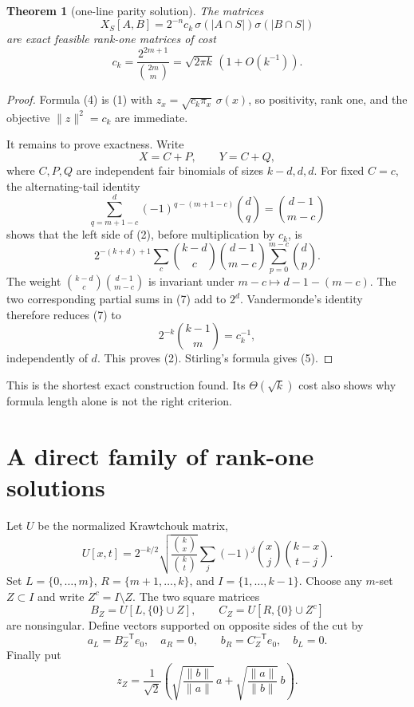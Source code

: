 \documentclass[11pt]{article}
\newcommand{\1}{\mathbf 1}
\newcommand{\norm}[1]{\lVert#1\rVert}
\newtheorem{theorem}{Theorem}
\begin{document}
\begin{theorem}[one-line parity solution]
The matrices
\begin{equation}
 \boxed{\quad
 X_S[A,B]=2^{-n}c_k\,
 \sigma(|A\cap S|)\sigma(|B\cap S|)
 \quad}                                                  \tag{4}
\end{equation}
are exact feasible rank-one matrices of cost
\[
 c_k=\frac{2^{2m+1}}{\binom{2m}{m}}
     =\sqrt{2\pi k}\,(1+O(k^{-1})).                     \tag{5}
\]
\end{theorem}

\begin{proof}
Formula (4) is (1) with
$z_x=\sqrt{c_k\pi_x}\,\sigma(x)$, so positivity, rank one, and the
objective $\norm z^2=c_k$ are immediate.

It remains to prove exactness.  Write
\[
 X=C+P,\qquad Y=C+Q,
\]
where $C,P,Q$ are independent fair binomials of sizes $k-d,d,d$.
For fixed $C=c$, the alternating-tail identity
\[
 \sum_{q=m+1-c}^{d}(-1)^{q-(m+1-c)}\binom dq
 =\binom{d-1}{m-c}                                      \tag{6}
\]
shows that the left side of (2), before multiplication by $c_k$, is
\[
 2^{-(k+d)+1}\sum_c\binom{k-d}{c}\binom{d-1}{m-c}
             \sum_{p=0}^{m-c}\binom dp.                 \tag{7}
\]
The weight
$\binom{k-d}{c}\binom{d-1}{m-c}$ is invariant under
$m-c\mapsto d-1-(m-c)$.  The two corresponding partial sums in (7)
add to $2^d$.  Vandermonde's identity therefore reduces (7) to
\[
 2^{-k}\binom{k-1}{m}=c_k^{-1},
\]
independently of $d$.  This proves (2).  Stirling's formula gives (5).
\end{proof}

This is the shortest exact construction found.  Its $\Theta(\sqrt{k})$
cost also shows why formula length alone is not the right criterion.

\section{A direct family of rank-one solutions}

Let $U$ be the normalized Krawtchouk matrix,
\[
 U[x,t]=2^{-k/2}\sqrt{\frac{\binom{k}{x}}{\binom{k}{t}}}
 \sum_j(-1)^j\binom{x}{j}\binom{k-x}{t-j}.              \tag{8}
\]
Set $L=\{0,\ldots,m\}$, $R=\{m+1,\ldots,k\}$, and
$I=\{1,\ldots,k-1\}$.  Choose any $m$-set $Z\subset I$ and write
$Z^c=I\setminus Z$.  The two square matrices
\[
 B_Z=U[L,\{0\}\cup Z],\qquad
 C_Z=U[R,\{0\}\cup Z^c]                                \tag{9}
\]
are nonsingular.  Define vectors supported on opposite sides of the cut by
\begin{equation}
 a_L=B_Z^{-\mathsf T}e_0,\quad a_R=0,
 \qquad
 b_R=C_Z^{-\mathsf T}e_0,\quad b_L=0.                   \tag{10}
\end{equation}
Finally put
\begin{equation}
 z_Z=\frac1{\sqrt2}\left(
  \sqrt{\frac{\norm b}{\norm a}}\,a+
  \sqrt{\frac{\norm a}{\norm b}}\,b\right).           \tag{11}
\end{equation}
\end{document}
